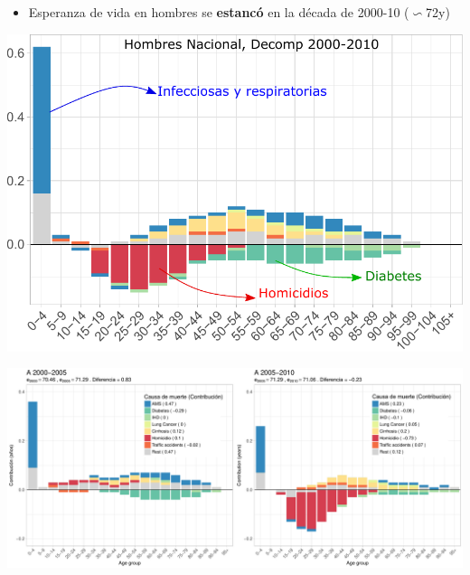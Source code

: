 \documentclass[xcolor={dvipsnames}]{beamer}
\begin{document}
\begin{frame}
\Large{
		\begin{itemize}
		    
		\item Esperanza de vida en hombres se \textbf{estanc\'o} en la d\'ecada de 2000-10 ($\backsim $72y)
		
				\end{itemize}
		
		\pause
				\begin{center}
		\includegraphics[scale=.55]{Figures/Fig_1}
				\end{center}
				

}
\end{frame}

\begin{frame}



\hbox{\hspace{-2em}\includegraphics[scale=.3]{Figures/Fig2}}

				

\end{frame}
\end{document}
